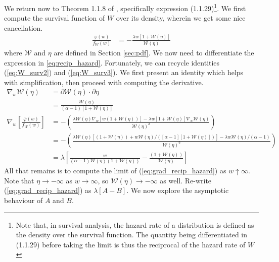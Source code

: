 \documentclass{article}
\newcommand{\sW}{\mathscr{W}}
\begin{document}
We return now to Theorem 1.1.8 of \citet{deH06}, specifically expression (1.1.29)\footnote{Note that, in survival analysis, the hazard rate of a distribution is defined as the density over the survival function. The quantity being differentiated in (1.1.29) before taking the limit is thus the reciprocal of the hazard rate of $W$}. We first compute the survival function of $W$ over its density, wherein we get some nice cancellation.
%
\begin{align}
    \frac{\bar{\varphi}(w)}{f_W(w)} &= - \frac{\lambda w [1 + \sW(\eta)]}{\sW(\eta)} \label{eq:recip_hazard}
\end{align}
%
where $\sW$ and $\eta$ are defined in Section \ref{sec:pdf}. We now need to differentiate the expression in \ref{eq:recip_hazard}. Fortunately, we can recycle identities (\ref{eq:W_surv2}) and (\ref{eq:W_surv3}). We first present an identity which helps with simplification, then proceed with computing the derivative.
%
\begin{align}
    \nabla_w \sW(\eta) &= \partial \sW(\eta) \cdot \partial \eta\\
    &= \frac{\sW(\eta)}{(\alpha - 1) [ 1 + \sW(\eta)]}\\
    \nabla_w \left[ \frac{\bar{\varphi}(w)}{f_W(w)} \right] &= - \left( \frac{\lambda \sW(\eta) \nabla_w [w ( 1 + \sW(\eta))] - \lambda w [ 1 + \sW(\eta)] \nabla_w \sW(\eta)}{\sW(\eta)^2} \right)\\
    &= - \left( \frac{\lambda \sW(\eta)[ (1 + \sW(\eta)) + w \sW(\eta) / ([\alpha - 1][1 + \sW(\eta)]) ] - \lambda w \sW(\eta) / (\alpha - 1)}{\sW(\eta)^2} \right)\\
    &= \lambda \left[\frac{w}{(\alpha - 1) \sW(\eta) (1 + \sW(\eta))} - \frac{(1 + \sW(\eta))}{\sW(\eta)} \right] \label{eq:grad_recip_hazard}
\end{align}
%
All that remains is to compute the limit of (\ref{eq:grad_recip_hazard}) as $w \uparrow \infty$. Note that $\eta \rightarrow - \infty$ as $w \rightarrow \infty$, so $\sW(\eta) \rightarrow - \infty$ as well. Re-write (\ref{eq:grad_recip_hazard}) as $\lambda [ A - B]$. We now explore the asymptotic behaviour of $A$ and $B$.
\end{document}
